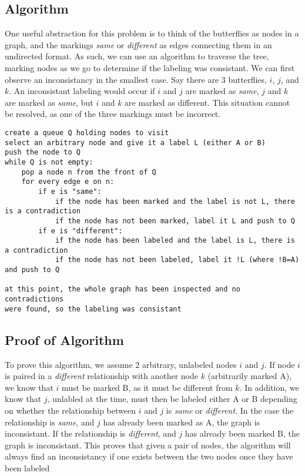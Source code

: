 \documentclass[titlepage]{article}
\numberwithin{equation}{subsection}
\begin{document}
\subsection{Algorithm}
One useful abstraction for this problem is to think of the butterflies
as nodes in a graph, and the markings \textit{same} or \textit{different}
as edges connecting them in an undirected format. As such, we can use an algorithm to
traverse the tree, marking nodes as we go to determine if the labeling was consistant.
We can first observe an inconsistancy in the smallest case. Say there are 3 butterflies,
$i$, $j$, and $k$. An inconsistant labeling would occur if $i$ and $j$ are marked as \textit{same},
$j$ and $k$ are marked as \textit{same}, but $i$ and $k$ are marked as different. This situation
cannot be resolved, as one of the three markings must be incorrect.
\begin{lstlisting}
create a queue Q holding nodes to visit
select an arbitrary node and give it a label L (either A or B)
push the node to Q
while Q is not empty:
    pop a node n from the front of Q
    for every edge e on n:
        if e is "same":
            if the node has been marked and the label is not L, there is a contradiction
            if the node has not been marked, label it L and push to Q
        if e is "different":
            if the node has been labeled and the label is L, there is a contradiction
            if the node has not been labeled, label it !L (where !B=A) and push to Q

at this point, the whole graph has been inspected and no contradictions
were found, so the labeling was consistant
\end{lstlisting}
\subsection{Proof of Algorithm}
To prove this algorithm, we assume 2 arbitrary, unlabeled nodes $i$ and $j$.
If node $i$ is paired in a \textit{different} relationship with another node
$k$ (arbitrarily marked A), we know that $i$ must be marked B, as it must
be different from $k$. In addition, we know that $j$, unlabled at the time,
must then be labeled either A or B depending on whether the relationship between
$i$ and $j$ is \textit{same} or \textit{different}. In the case the relationship is
\textit{same}, and $j$ has already been marked as A, the graph is inconsistant.
If the relationship is \textit{different}, and $j$ has already been marked B,
the graph is inconsistant. This proves that given a pair of nodes, the algorithm
will always find an inconsistancy if one exists between the two nodes once
they have been labeled
\end{document}
